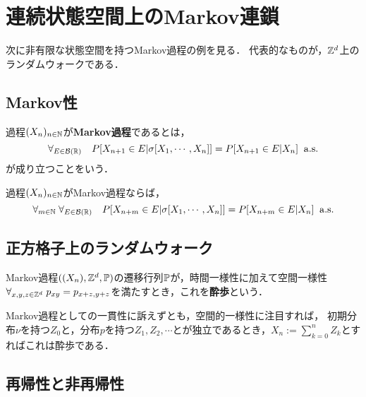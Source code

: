 \documentclass[uplatex,dvipdfmx]{jsreport}
\begin{document}
\section{連続状態空間上のMarkov連鎖}

\begin{tcolorbox}[colframe=ForestGreen, colback=ForestGreen!10!white,breakable,colbacktitle=ForestGreen!40!white,coltitle=black,fonttitle=\bfseries\sffamily,
title=]
    次に非有限な状態空間を持つMarkov過程の例を見る．
    代表的なものが，$\mathbb{Z}^d$上のランダムウォークである．
\end{tcolorbox}

\subsection{Markov性}

\begin{definition}
    過程$(X_n)_{n\in\mathbb{N}}$が\textbf{Markov過程}であるとは，
    \[\forall_{E\in\mathcal{B}(\mathbb{R})}\quad P[X_{n+1}\in E|\sigma[X_1,\cdots,X_n]]=P[X_{n+1}\in E|X_n]\;\;\mathrm{a.s.}\]
    が成り立つことをいう．
\end{definition}

\begin{lemma}[Markov性の特徴付け]
    過程$(X_n)_{n\in\mathbb{N}}$がMarkov過程ならば，
    \[\forall_{m\in\mathbb{N}}\;\forall_{E\in\mathcal{B}(\mathbb{R})}\quad P[X_{n+m}\in E|\sigma[X_1,\cdots,X_n]]=P[X_{n+m}\in E|X_n]\;\;\mathrm{a.s.}\]
\end{lemma}

\subsection{正方格子上のランダムウォーク}

\begin{definition}
    Markov過程$((X_n),\mathbb{Z}^d,\mathbb{P})$の遷移行列$\mathbb{P}$が，時間一様性に加えて空間一様性$\forall_{x,y,z\in\mathbb{Z}^d}\;p_{xy}=p_{x+z,y+z}$を満たすとき，これを\textbf{酔歩}という．
\end{definition}

\begin{discussion}[加法過程としての構成]\label{discussion-random-walk}
    Markov過程としての一貫性に訴えずとも，空間的一様性に注目すれば，
    初期分布$\nu$を持つ$Z_0$と，分布$p$を持つ$Z_1,Z_2,\cdots$とが独立であるとき，$X_n:=\sum^n_{k=0}Z_k$とすればこれは酔歩である．
\end{discussion}

\subsection{再帰性と非再帰性}
\end{document}
